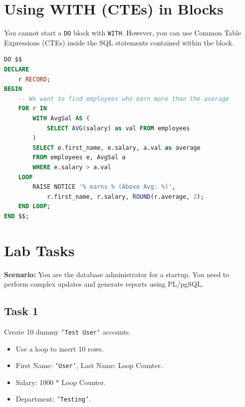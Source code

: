 \documentclass[12pt,a4paper]{article}
\newif\ifshowsolutions
\begin{document}
\newpage
\section{Using WITH (CTEs) in Blocks}

You cannot start a \texttt{DO} block with \texttt{WITH}. However, you can use Common Table Expressions (CTEs) inside the SQL statements contained within the block.

\begin{lstlisting}[language=SQL, caption={CTE inside Anonymous Block}]
DO $$ 
DECLARE
    r RECORD;
BEGIN
    -- We want to find employees who earn more than the average
    FOR r IN 
        WITH AvgSal AS (
            SELECT AVG(salary) as val FROM employees
        )
        SELECT e.first_name, e.salary, a.val as average
        FROM employees e, AvgSal a
        WHERE e.salary > a.val
    LOOP
        RAISE NOTICE '% earns % (Above Avg: %)', 
            r.first_name, r.salary, ROUND(r.average, 2);
    END LOOP;
END $$;
\end{lstlisting}

\newpage
\section{Lab Tasks}

\textbf{Scenario:} You are the database administrator for a startup. You need to perform complex updates and generate reports using PL/pgSQL.

\subsection*{Task 1}
Create 10 dummy \texttt{'Test User'} accounts.
\begin{itemize}
    \item Use a loop to insert 10 rows.
    \item First Name: \texttt{'User'}, Last Name: Loop Counter.
    \item Salary: 1000 * Loop Counter.
    \item Department: \texttt{'Testing'}.
\end{itemize}

\ifshowsolutions
\textbf{Solution:}
\begin{lstlisting}[language=SQL]
DO $$ 
DECLARE
    v_counter INT := 1;
BEGIN
    WHILE v_counter <= 10 LOOP
        INSERT INTO employees (first_name, last_name, salary, department)
        VALUES ('User', CAST(v_counter AS TEXT), v_counter * 1000, 'Testing');
        
        v_counter := v_counter + 1;
    END LOOP;
    RAISE NOTICE '10 Test Users Created.';
END $$;
\end{lstlisting}
\fi
\end{document}
